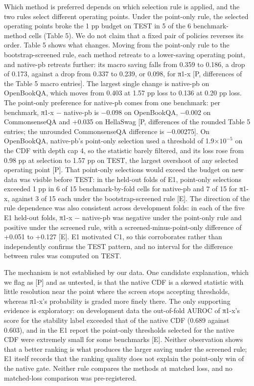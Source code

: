 Which method is preferred depends on which selection rule is applied, and the two rules select different operating points. Under the point-only rule, the selected operating points broke the 1 pp budget on TEST in 5 of the 6 benchmark-method cells (Table 5). We do not claim that a fixed pair of policies reverses its order. Table 5 shows what changes. Moving from the point-only rule to the bootstrap-screened rule, each method retreats to a lower-saving operating point, and native-pb retreats further: its macro saving falls from 0.359 to 0.186, a drop of 0.173, against a drop from 0.337 to 0.239, or 0.098, for π1-x {[}P, differences of the Table 5 macro entries{]}. The largest single change is native-pb on OpenBookQA, which moves from 0.403 at 1.57 pp loss to 0.136 at 0.20 pp loss. The point-only preference for native-pb comes from one benchmark: per benchmark, π1-x − native-pb is −0.098 on OpenBookQA, −0.002 on CommonsenseQA and +0.035 on HellaSwag {[}P, differences of the rounded Table 5 entries; the unrounded CommonsenseQA difference is $-0.00275${]}. On OpenBookQA, native-pb's point-only selection used a threshold of 1.9\(\times 10^{-5}\) on the CDF with depth cap 4, so the statistic barely filtered, and its loss rose from 0.98 pp at selection to 1.57 pp on TEST, the largest overshoot of any selected operating point {[}P{]}. That point-only selections would exceed the budget on new data was visible before TEST: in the held-out folds of E1, point-only selections exceeded 1 pp in 6 of 15 benchmark-by-fold cells for native-pb and 7 of 15 for π1-x, against 3 of 15 each under the bootstrap-screened rule {[}E{]}. The direction of the rule dependence was also consistent across development folds: in each of the five E1 held-out folds, π1-x − native-pb was negative under the point-only rule and positive under the screened rule, with a screened-minus-point-only difference of +0.051 to +0.127 {[}E{]}. E1 motivated C1, so this corroborates rather than independently confirms the TEST pattern, and no interval for the difference between rules was computed on TEST.

The mechanism is not established by our data. One candidate explanation, which we flag as {[}P{]} and as untested, is that the native CDF is a skewed statistic with little resolution near the point where the screen stops accepting thresholds, whereas π1-x's probability is graded more finely there. The only supporting evidence is exploratory: on development data the out-of-fold AUROC of π1-x's score for the stability label exceeded that of the native CDF (0.689 against 0.603), and in the E1 report the point-only thresholds selected for the native CDF were extremely small for some benchmarks {[}E{]}. Neither observation shows that a better ranking is what produces the larger saving under the screened rule; E1 itself records that the ranking quality does not explain the point-only win of the native gate. Neither rule compares the methods at matched loss, and no matched-loss comparison was pre-registered.

